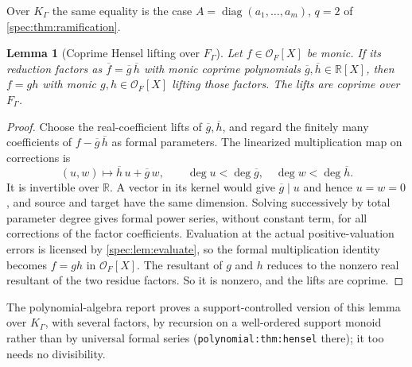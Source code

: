 \documentclass[11pt,a4paper]{article}
\numberwithin{equation}{section}
\newtheorem{lemma}[lemma]{Lemma}
\theoremstyle{definition}
\theoremstyle{remark}
\newcommand{\R}{\mathbb R}
\newcommand{\OO}{\mathcal O}
\newcommand{\diag}{\operatorname{diag}}
\begin{document}
Over $K_\Gamma$ the same equality is the case $A=\diag(a_1,\ldots,a_m)$,
$q=2$ of \cref{spec:thm:ramification}.

\begin{lemma}[Coprime Hensel lifting over $F_\Gamma$]\label{spec:hank:lem:hensel}
Let $f\in\OO_F[X]$ be monic. If its reduction factors as
$\overline f=\overline g\,\overline h$ with monic coprime polynomials
$\overline g,\overline h\in\R[X]$, then $f=gh$ with monic $g,h\in\OO_F[X]$
lifting those factors. The lifts are coprime over $F_\Gamma$.
\end{lemma}
\begin{proof}
Choose the real-coefficient lifts of $\overline g,\overline h$, and regard
the finitely many coefficients of $f-\overline g\,\overline h$ as formal
parameters. The linearized multiplication map on corrections is
\[
 (u,w)\longmapsto \overline h\,u+\overline g\,w,
 \qquad \deg u<\deg\overline g,
 \quad \deg w<\deg\overline h.
\]
It is invertible over $\R$. A vector in its kernel would give
$\overline g\mid u$ and hence $u=w=0$, and source and target have the same
dimension. Solving successively by total parameter degree gives formal power
series, without constant term, for all corrections of the factor
coefficients. Evaluation at the actual positive-valuation errors is licensed
by \cref{spec:lem:evaluate}, so the formal multiplication identity becomes
$f=gh$ in $\OO_F[X]$. The resultant of $g$ and $h$ reduces to the nonzero
real resultant of the two residue factors. So it is nonzero, and the lifts are
coprime.
\end{proof}

The polynomial-algebra report proves a support-controlled version of this
lemma over $K_\Gamma$, with several factors, by recursion on a well-ordered
support monoid rather than by universal formal series
(\texttt{polynomial:thm:hensel} there); it too needs no divisibility.
\end{document}
